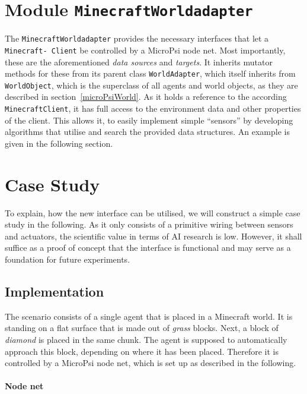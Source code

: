     \section{Module \texttt{MinecraftWorldadapter}}

The \texttt{MinecraftWorldadapter} provides the necessary interfaces that let a \texttt{Minecraft- Client} be controlled by a MicroPsi node net. Most importantly, these are the aforementioned \emph{data sources} and \emph{targets}. It inherits mutator methods for these from its parent class \texttt{WorldAdapter}, which itself inherits from \texttt{WorldObject}, which is the superclass of all agents and world objects, as they are described in section~\ref{microPsiWorld}. As it holds a reference to the according \texttt{MinecraftClient}, it has full access to the environment data and other properties of the client. This allows it, to easily implement simple ``sensors'' by developing algorithms that utilise and search the provided data structures. An example is given in the following section.
    
    \section{Case Study}
    \label{case_study}

To explain, how the new interface can be utilised, we will construct a simple case study in the following. As it only consists of a primitive wiring between sensors and actuators, the scientific value in terms of AI research is low. However, it shall suffice as a proof of concept that the interface is functional and may serve as a foundation for future experiments.

        \subsection{Implementation}

The scenario consists of a single agent that is placed in a Minecraft world. It is standing on a flat surface that is made out of \emph{grass} blocks. Next, a block of \emph{diamond} is placed in the same chunk. The agent is supposed to automatically approach this block, depending on where it has been placed. Therefore it is controlled by a MicroPsi node net, which is set up as described in the following.

\paragraph{Node net}$\;$ \\

